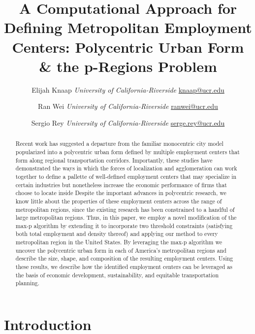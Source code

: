 \documentclass[11pt,article,oneside]{memoir}
\title{\bigskip A Computational Approach for Defining Metropolitan
Employment Centers: Polycentric Urban Form \& the p-Regions Problem}
\author{\large Elijah
Knaap\vspace{0.05in} \newline\normalsize\emph{University of
California-Riverside} \newline\footnotesize \url{knaap@ucr.edu}\vspace*{0.2in}\newline  \and \large Ran
Wei\vspace{0.05in} \newline\normalsize\emph{University of
California-Riverside} \newline\footnotesize \url{ranwei@ucr.edu}\vspace*{0.2in}\newline  \and \large Sergio
Rey\vspace{0.05in} \newline\normalsize\emph{University of
California-Riverside} \newline\footnotesize \url{serge.rey@ucr.edu}\vspace*{0.2in}\newline }
\date{}
\begin{document}
\setsansfont[Mapping=tex-text]{Roboto}
\setmonofont[Mapping=tex-text,Scale=0.8]{Oxygen Mono}
\pagestyle{kjh}


\maketitle



\begin{abstract}\vspace*{-2cm}


\noindent Recent work has suggested a departure from the familiar
monocentric city model popularized into a polycentric urban form defined
by multiple employment centers that form along regional transportation
corridors. Importantly, these studies have demonstrated the ways in
which the forces of localization and agglomeration can work together to
define a pallette of well-defined employment centers that may specialize
in certain industries but nonetheless increase the economic performance
of firms that choose to locate inside Despite the important advances in
polycentric research, we know little about the properties of these
employment centers across the range of metropolitan regions, since the
existing research has been constrained to a handful of large
metropolitan regions. Thus, in this paper, we employ a novel
modification of the max-p algorithm by extending it to incorporate two
threshold constraints (satisfying both total employment and density
thereof) and applying our method to every metropolitan region in the
United States. By leveraging the max-p algorithm we uncover the
polycentric urban form in each of America's metropolitan regions and
describe the size, shape, and composition of the resulting employment
centers. Using these results, we describe how the identified employment
centers can be leveraged as the basis of economic development,
sustainability, and equitable transportation planning.

\end{abstract}


\hypertarget{introduction}{%
\section{Introduction}\label{introduction}}
\end{document}
